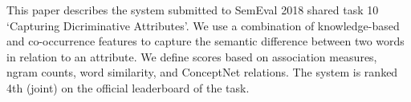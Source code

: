 This paper describes the system submitted to SemEval 2018 shared task 10 ‘Capturing Dicriminative  Attributes'.   We  use  a  combination  of knowledge-based  and  co-occurrence features to capture the semantic difference between two words in relation to an attribute. We define scores based on association measures, ngram counts,  word similarity,  and ConceptNet relations.  The system is ranked 4th (joint) on the official leaderboard of the task.
